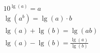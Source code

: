 \begin{align}
	10^{\lg(a)}=a \\
	\lg(a^b) = \lg(a)\cdot b \\
	\lg(a)+\lg(b) = \lg(ab) \\
	\lg(a)-\lg(b) = \frac{\lg(a)}{\lg(b)} \\
\end{align} 






































































